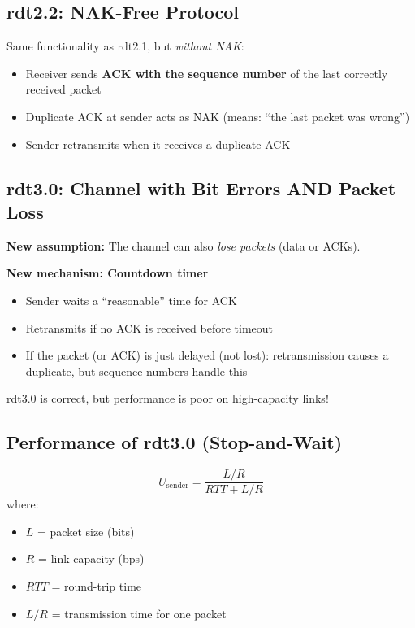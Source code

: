 \subsection{rdt2.2: NAK-Free Protocol}

\begin{keybox}
Same functionality as rdt2.1, but \emph{without NAK}:
\begin{itemize}[noitemsep]
    \item Receiver sends \textbf{ACK with the sequence number} of the last correctly received packet
    \item Duplicate ACK at sender acts as NAK (means: ``the last packet was wrong'')
    \item Sender retransmits when it receives a duplicate ACK
\end{itemize}
\end{keybox}

\subsection{rdt3.0: Channel with Bit Errors AND Packet Loss}

\begin{keybox}
\textbf{New assumption:} The channel can also \emph{lose packets} (data or ACKs).

\textbf{New mechanism: Countdown timer}
\begin{itemize}[noitemsep]
    \item Sender waits a ``reasonable'' time for ACK
    \item Retransmits if no ACK is received before timeout
    \item If the packet (or ACK) is just delayed (not lost): retransmission causes a duplicate, but sequence numbers handle this
\end{itemize}
rdt3.0 is correct, but performance is poor on high-capacity links!
\end{keybox}

\begin{imagebox}
\end{imagebox}

\subsection{Performance of rdt3.0 (Stop-and-Wait)}

\begin{formulabox}
\[
U_{\text{sender}} = \frac{L/R}{RTT + L/R}
\]
where:
\begin{itemize}[noitemsep]
    \item $L$ = packet size (bits)
    \item $R$ = link capacity (bps)
    \item $RTT$ = round-trip time
    \item $L/R$ = transmission time for one packet
\end{itemize}
\end{formulabox}

